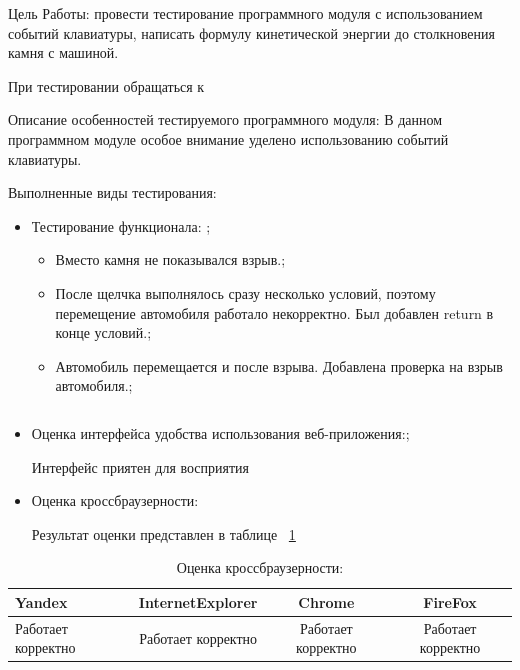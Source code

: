     Цель Работы: провести тестирование программного модуля с использованием событий клавиатуры, написать формулу кинетической энергии до столкновения камня с машиной.

    При тестировании обращаться к \cite{ref-book}\
    
    Описание особенностей тестируемого программного модуля: В данном программном модуле особое внимание уделено использованию событий клавиатуры. 
    
    Выполненные виды тестирования: 
\begin{itemize}
    \item Тестирование функционала: ;
    \begin{itemize}
    \item Вместо камня не показывался взрыв.;
    \item После щелчка выполнялось сразу несколько условий, поэтому перемещение автомобиля работало некорректно. Был добавлен return в конце условий.;
    \item Автомобиль перемещается и после взрыва. Добавлена проверка на взрыв автомобиля.; 
\end{itemize}
\begin{code}
	\inputminted[breaklines=true, xleftmargin=1em, linenos, frame=single, framesep=10pt, fontsize=\footnotesize, firstline=1]{haskell}{listings/code.js}
    \end{code}
    \item Оценка интерфейса удобства использования веб-приложения:;

    Интерфейс приятен для восприятия

    \item Оценка кроссбраузерности:
    
Результат оценки представлен в таблице ~\ref{tab_1}
    
\end{itemize}

\begin{table}[H]
	\caption{Оценка кроссбраузерности:}
	\begin{center}
		\begin{tabular*}{\textwidth}{@{\extracolsep{\fill} } lccc}
			\toprule
			Yandex & InternetExplorer & Chrome & FireFox \\
			\midrule
			Работает корректно       & Работает корректно    & Работает корректно & Работает корректно    \\
			\bottomrule
		\end{tabular*}
		\label{tab_1}
	\end{center}
\end{table}

